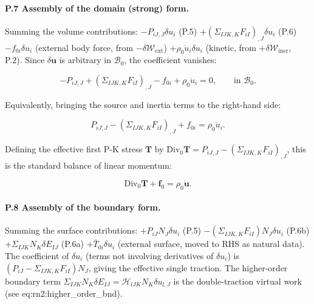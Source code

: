 \documentclass[11pt]{article}
\begin{document}
\checkmark

\paragraph{P.7 Assembly of the domain (strong) form.}

Summing the volume contributions:
$-P_{iJ,J}\delta u_i$ (P.5) $+(\Sigma_{IJK,K}F_{iI})_{,J}\delta u_i$ (P.6) $-f_{0i}\delta u_i$ (external body force, from $-\delta\mathcal{W}_{\mathrm{ext}}$) $+\rho_0\ddot{u}_i\delta u_i$ (kinetic, from $+\delta\mathcal{W}_{\mathrm{iner}}$, P.2). Since $\delta\mathbf{u}$ is arbitrary in $\mathcal{B}_0$, the coefficient vanishes:

\begin{equation}
-P_{iJ,J}+(\Sigma_{IJK,K}F_{iI})_{,J}-f_{0i}+\rho_0\ddot{u}_i=0,
\qquad\text{in }\mathcal{B}_0.
\label{rn2:strong}
\end{equation}

Equivalently, bringing the source and inertia terms to the right-hand side:

\begin{equation}
P_{iJ,J}-(\Sigma_{IJK,K}F_{iI})_{,J}+f_{0i}=\rho_0\ddot{u}_i.
\label{rn2:strong_balance}
\end{equation}

Defining the effective first P-K stress $\mathbf{T}$ by $\mathrm{Div}_0\mathbf{T}=P_{iJ,J}-(\Sigma_{IJK,K}F_{iI})_{,J}$, this is the standard balance of linear momentum:

\begin{equation}
\mathrm{Div}_0\mathbf{T}+\mathbf{f}_0=\rho_0\ddot{\mathbf{u}}.
\label{rn2:strong_balance_short}
\end{equation}

\checkmark

\paragraph{P.8 Assembly of the boundary form.}

Summing the surface contributions:
$+P_{iJ}N_J\delta u_i$ (P.5) $-(\Sigma_{IJK,K}F_{iI})N_J\delta u_i$ (P.6b) $+\Sigma_{IJK}N_K\delta E_{IJ}$ (P.6a) $+\bar{T}_{0i}\delta u_i$ (external surface, moved to RHS as natural data). The coefficient of $\delta u_i$ (terms not involving derivatives of $\delta u_i$) is $(P_{iJ}-\Sigma_{IJK,K}F_{iI})N_J$, giving the effective single traction. The higher-order boundary term $\Sigma_{IJK}N_K\delta E_{IJ}=\mathcal{H}_{lJK}N_K\delta u_{l,J}$ is the double-traction virtual work (see eq:rn2:higher\_order\_bnd). \checkmark
\end{document}
